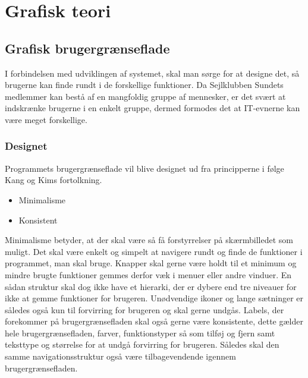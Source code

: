 \chapter{Grafisk teori}

 

\section{Grafisk brugergrænseflade} \label{chap:GUI}

I forbindelsen med udviklingen af systemet, skal man sørge for at designe det, så brugerne kan finde rundt i de forskellige funktioner. 
Da Sejlklubben Sundets medlemmer kan bestå af en mangfoldig gruppe af mennesker, er det svært at indskrænke brugerne i en enkelt gruppe, dermed formodes det at IT-evnerne kan være meget forskellige.


\subsection{Designet} \label{sec:Designet}

Programmets brugergrænseflade vil blive designet ud fra principperne i følge Kang og Kims fortolkning. \citep{gui1} 

\begin{itemize}
	\item Minimalisme
	\item Konsistent
\end{itemize}

Minimalisme betyder, at der skal være så få forstyrrelser på skærmbilledet som muligt. 
Det skal være enkelt og simpelt at navigere rundt og finde de funktioner i programmet, man skal bruge. Knapper skal gerne være holdt til et minimum og mindre brugte funktioner gemmes derfor væk i menuer eller andre vinduer.
En sådan struktur skal dog ikke have et hierarki, der er dybere end tre niveauer for ikke at gemme funktioner for brugeren.
Unødvendige ikoner og lange sætninger er således også kun til forvirring for brugeren og skal gerne undgås.
Labels, der forekommer på brugergrænsefladen skal også gerne være konsistente, dette gælder hele brugergrænsefladen, farver, funktionstyper så som tilføj og fjern samt teksttype og størrelse for at undgå forvirring for brugeren.
Således skal den samme navigationsstruktur også være tilbagevendende igennem brugergrænsefladen.

